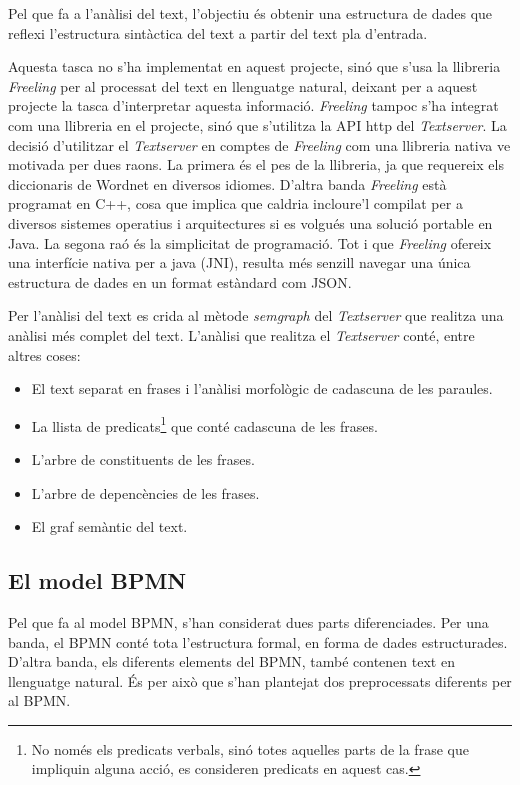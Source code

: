 Pel que fa a l'anàlisi del text, l'objectiu és obtenir una estructura de dades que reflexi l'estructura sintàctica del text a partir del text pla d'entrada.

Aquesta tasca no s'ha implementat en aquest projecte, sinó que s'usa la llibreria \emph{Freeling} per al processat del text en llenguatge natural, deixant per a aquest projecte la tasca d'interpretar aquesta informació. \emph{Freeling} tampoc s'ha integrat com una llibreria en el projecte, sinó que s'utilitza la API http del \emph{Textserver}. La decisió d'utilitzar el \emph{Textserver} en comptes de \emph{Freeling} com una llibreria nativa ve motivada per dues raons. La primera és el pes de la llibreria, ja que requereix els diccionaris de Wordnet en diversos idiomes. D'altra banda \emph{Freeling} està programat en C++, cosa que implica que caldria incloure'l compilat per a diversos sistemes operatius i arquitectures si es volgués una solució portable en Java. La segona raó és la simplicitat de programació. Tot i que \emph{Freeling} ofereix una interfície nativa per a java (JNI), resulta més senzill navegar una única estructura de dades en un format estàndard com JSON.

Per l'anàlisi del text es crida al mètode \emph{semgraph} del \emph{Textserver} que realitza una anàlisi més complet del text. L'anàlisi que realitza el \emph{Textserver} conté, entre altres coses:

\begin{itemize}
    \item El text separat en frases i l'anàlisi morfològic de cadascuna de les paraules.
    \item La llista de predicats\footnote{No només els predicats verbals, sinó totes aquelles parts de la frase que impliquin alguna acció, es consideren predicats en aquest cas.} que conté cadascuna de les frases.
    \item L'arbre de constituents de les frases.
    \item L'arbre de depencències de les frases.
    \item El graf semàntic del text.
\end{itemize}

\subsection{El model BPMN}
\label{sec:implementacio-preprocessat-model}

Pel que fa al model BPMN, s'han considerat dues parts diferenciades. Per una banda, el BPMN conté tota l'estructura formal, en forma de dades estructurades. D'altra banda, els diferents elements del BPMN, també contenen text en llenguatge natural. És per això que s'han plantejat dos preprocessats diferents per al BPMN.

